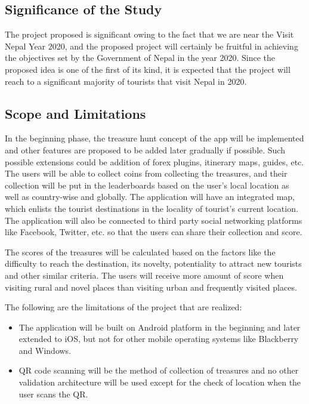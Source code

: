 \documentclass[12pt, a4paper, oneside]{article}
\begin{document}
\subsection{Significance of the Study}
The project proposed is significant owing to the fact that we are near the Visit Nepal Year 2020, and the proposed project will certainly be fruitful in achieving the objectives set by the Government of Nepal in the year 2020. Since the proposed idea is one of the first of its kind, it is expected that the project will reach to a significant majority of tourists that visit Nepal in 2020.

\subsection{Scope and Limitations}
In the beginning phase, the treasure hunt concept of the app will be implemented and other features are proposed to be added later gradually if possible. Such possible extensions could be addition of forex plugins, itinerary maps, guides, etc. The users will be able to collect coins from collecting the treasures, and their collection will be put in the leaderboards based on the user's local location as well as country-wise and globally. The application will have an integrated map, which enlists the tourist destinations in the locality of tourist's current location. The application will also be connected to third party social networking platforms like Facebook, Twitter, etc. so that the users can share their collection and score. 

The scores of the treasures will be calculated based on the factors like the difficulty to reach the destination, its novelty, potentiality to attract new tourists and other similar criteria. The users will receive more amount of score when visiting rural and novel places than visiting urban and frequently visited places.

The following are the limitations of the project that are realized:
\begin{itemize}
 	\item The application will be built on Android platform in the beginning and later extended to iOS, but not for other mobile operating systems like Blackberry and Windows.
	\item QR code scanning will be the method of collection of treasures and no other validation architecture will be used except for the check of location when the user scans the QR.
 \end{itemize}
\end{document}
